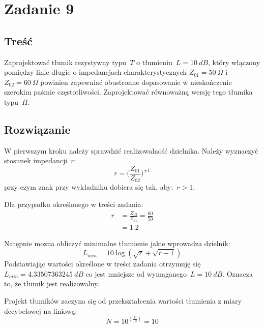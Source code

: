 \documentclass[rep.tex]{subfiles}
\begin{document}
\chapter{Zadanie 9}
\label{zad9}
\section{Treść}
Zaprojektować tłumik rezystywny typu~$T$ o tłumieniu~$L = 10~dB$,
który włączony pomiędzy linie długie o impedancjach charakterystycznych $Z_{01} = 50~\Omega$ i $Z_{02} = 60~\Omega$
powinien zapewniać obustronne dopasowanie w nieskończenie szerokim paśmie częstotliwości.
Zaprojektować równoważną wersję tego tłumika typu~$\Pi$.

\section{Rozwiązanie}
W pierwszym kroku należy sprawdzić realizowalność dzielnika.
Należy wyznaczyć stosunek impedancji~$r$:
\begin{equation}
  r = \Big(\frac{Z_{01}}{Z_{02}}\Big)^{\pm1}
\end{equation}
przy czym znak przy wykładniku dobiera się tak, aby:~$r > 1$.

Dla przypadku określonego w treści zadania:
\begin{align}
  r &= \frac{Z_{02}}{Z_{01}} = \frac{60}{50} \nonumber \\
  &= 1.2 \nonumber
\end{align}

Natępnie mozna obliczyć minimalne tłumienie jakie wprowadza dzielnik:
\begin{equation}
  L_{min} = 10 \log(\sqrt{r} + \sqrt{r - 1})
\end{equation}
Podstawiając wartości określone w treści zadania otrzymuję się~$L_{min} = 4.33507363245~dB$ co jest mniejsze od wymaganego~$L = 10~dB$.
Oznacza to, że tłumik jest realizowalny.

Projekt tłumików zaczyna się od przekształcenia wartości tłumienia z miary decybelowej na liniową:
\begin{equation}
  N = 10^{(\frac{L}{10})} = 10
\end{equation}
\end{document}
